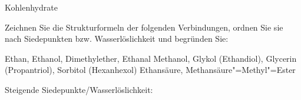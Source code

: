 \documentclass{scrartcl}
\begin{document}
\begin{center}
  \Huge\sffamily Kohlenhydrate
\end{center}

\begin{question}[name=Physikalische Eigenschaften]
  Zeichnen Sie die Strukturformeln der folgenden Verbindungen, ordnen Sie sie
  nach Siedepunkten bzw. Wasserlöslichkeit und begründen Sie:
  \begin{tasks}
    \task Ethan, Ethanol, Dimethylether, Ethanal
    \task Methanol, Glykol (Ethandiol), Glycerin (Propantriol), Sorbitol
      (Hexanhexol)
    \task Ethansäure, Methansäure"=Methyl"=Ester
  \end{tasks}
\end{question}
\begin{solution}[name=Physikalische Eigenschaften]
  Steigende Siedepunkte\slash Wasserlöslichkeit:
  \begin{tasks}
    \task
       \qquad
       \qquad
       \qquad
    \task
       \qquad
       \qquad
      
    \task
       \qquad
  \end{tasks}
\end{solution}
\end{document}
